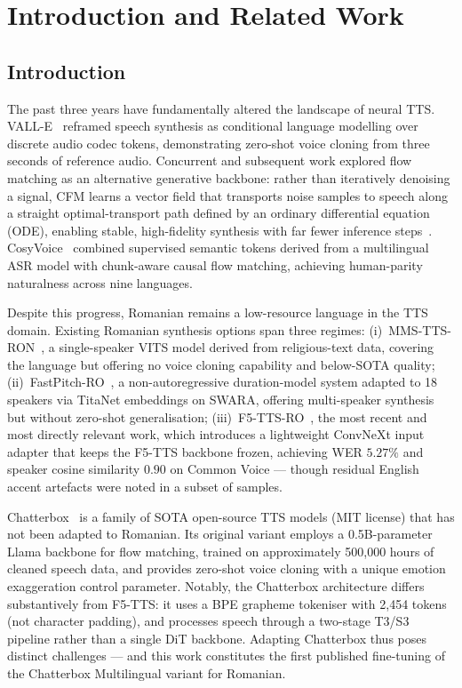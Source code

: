 \documentclass[conference]{IEEEtran}
\begin{document}
\section{Introduction and Related Work}
\label{sec:intro}

\subsection{Introduction}

The past three years have fundamentally altered the landscape of
neural TTS.
VALL-E~\cite{valle} reframed speech synthesis as conditional language
modelling over discrete audio codec tokens, demonstrating zero-shot
voice cloning from three seconds of reference audio.
Concurrent and subsequent work explored flow matching as an
alternative generative backbone: rather than iteratively denoising
a signal, CFM learns a vector field that transports noise samples to
speech along a straight optimal-transport path defined by an ordinary
differential equation (ODE), enabling stable, high-fidelity synthesis
with far fewer inference steps~\cite{f5tts}.
CosyVoice~\cite{cosyvoice} combined supervised semantic tokens derived
from a multilingual ASR model with chunk-aware causal flow matching,
achieving human-parity naturalness across nine languages.

Despite this progress, Romanian remains a low-resource language in the
TTS domain.
Existing Romanian synthesis options span three regimes:
(i)~MMS-TTS-RON~\cite{mms}, a single-speaker VITS model derived from
religious-text data, covering the language but offering no voice
cloning capability and below-SOTA quality;
(ii)~FastPitch-RO~\cite{fastpitch_ro}, a non-autoregressive
duration-model system adapted to 18 speakers via TitaNet embeddings
on SWARA, offering multi-speaker synthesis but without zero-shot
generalisation;
(iii)~F5-TTS-RO~\cite{f5tts_ro}, the most recent and most directly
relevant work, which introduces a lightweight ConvNeXt input adapter
that keeps the F5-TTS backbone frozen, achieving WER $5.27\%$ and
speaker cosine similarity $0.90$ on Common Voice — though residual
English accent artefacts were noted in a subset of samples.

Chatterbox~\cite{chatterbox} is a family of SOTA open-source TTS
models (MIT license) that has not been adapted to Romanian.
Its original variant employs a 0.5B-parameter Llama backbone for
flow matching, trained on approximately 500,000 hours of cleaned
speech data, and provides zero-shot voice cloning with a unique
emotion exaggeration control parameter.
Notably, the Chatterbox architecture differs substantively from
F5-TTS: it uses a BPE grapheme tokeniser with 2,454 tokens (not
character padding), and processes speech through a two-stage T3/S3
pipeline rather than a single DiT backbone.
Adapting Chatterbox thus poses distinct challenges — and this work
constitutes the first published fine-tuning of the Chatterbox
Multilingual variant for Romanian.
\end{document}
